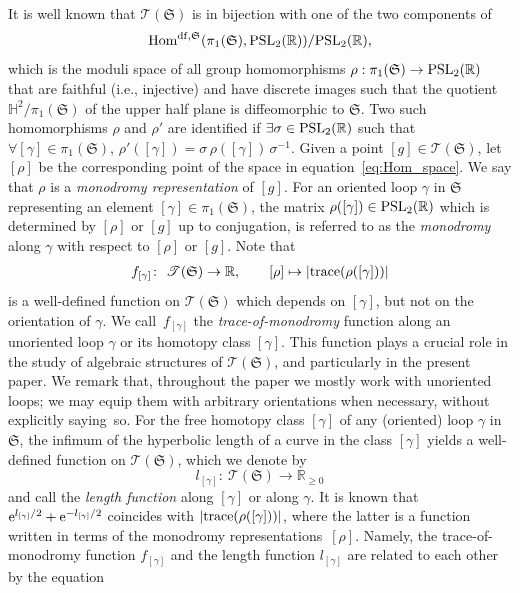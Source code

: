 \documentclass[10pt,a4paper]{amsart}
\numberwithin{equation}{section}
\theoremstyle{definition}
\begin{document}
It is well known that $\mathscr{T}(\mathfrak{S})$ is in bijection with one of the two components of
\begin{align}
\label{eq:Hom_space}
{\rm Hom}^{{\rm df},\mathfrak{S}}(\pi_1(\mathfrak{S}), {\rm PSL}_2(\mathbb{R}))/{\rm PSL}_2(\mathbb{R}),
\end{align}
which is the moduli space of all group homomorphisms $\rho : \pi_1(\mathfrak{S}) \to {\rm PSL}_2(\mathbb{R})$ that are faithful (i.e., injective) and have discrete images such that the quotient $\mathbb{H}^2 /\pi_1(\mathfrak{S})$ of the upper half plane is diffeomorphic to $\mathfrak{S}$. Two such homomorphisms $\rho$ and $\rho'$ are identified if $\exists \sigma \in {\rm PSL}_2(\mathbb{R})$ such that $\forall [\gamma] \in \pi_1(\mathfrak{S})$, $\rho'([\gamma]) = \sigma \, \rho([\gamma]) \, \sigma^{-1}$.
Given a point $[g] \in \mathscr{T}(\mathfrak{S})$, let $[\rho]$ be the corresponding point of the space in equation~\eqref{eq:Hom_space}. We say that $\rho$ is a {\em monodromy representation} of $[g]$. For an oriented loop $\gamma$ in $\mathfrak{S}$ representing an element $[\gamma] \in \pi_1(\mathfrak{S})$, the matrix $\rho([\gamma]) \in {\rm PSL}_2(\mathbb{R})$ which is determined by $[\rho]$ or $[g]$ up to conjugation, is referred to as the {\em monodromy} along $\gamma$ with respect to $[\rho]$ or $[g]$. Note that
\begin{align*}
f_{[\gamma]} \colon \ \mathscr{T}(\mathfrak{S}) \to \mathbb{R}, \qquad [\rho] \mapsto |{\rm trace}(\rho([\gamma]))|
\end{align*}
is a well-defined function on $\mathscr{T}(\mathfrak{S})$ which depends on $[\gamma]$, but not on the orientation of $\gamma$. We call~$f_{[\gamma]}$ the {\em trace-of-monodromy} function along an unoriented loop $\gamma$ or its homotopy class $[\gamma]$. This function plays a crucial role in the study of algebraic structures of $\mathscr{T}(\mathfrak{S})$, and particularly in the present paper. We remark that, throughout the paper we mostly work with unoriented loops; we may equip them with arbitrary orientations when necessary, without explicitly saying~so.
For the free homotopy class $[\gamma]$ of any (oriented) loop $\gamma$ in $\mathfrak{S}$, the infimum of the hyperbolic length of a curve in the class $[\gamma]$ yields a well-defined function on $\mathscr{T}(\mathfrak{S})$, which we denote by
\[
l_{[\gamma]} \colon \ \mathscr{T}(\mathfrak{S}) \to \mathbb{R}_{\ge 0}
\]
and call the {\em length function} along $[\gamma]$ or along $\gamma$. It is known that ${\rm e}^{l_{[\gamma]}/2} + {\rm e}^{-l_{[\gamma]}/2}$ coincides with $|{\rm trace}(\rho([\gamma]))|$, where the latter is a function written in terms of the monodromy representations~$[\rho]$. Namely, the trace-of-monodromy function $f_{[\gamma]}$ and the length function $l_{[\gamma]}$ are related to each other by the equation
\end{document}
